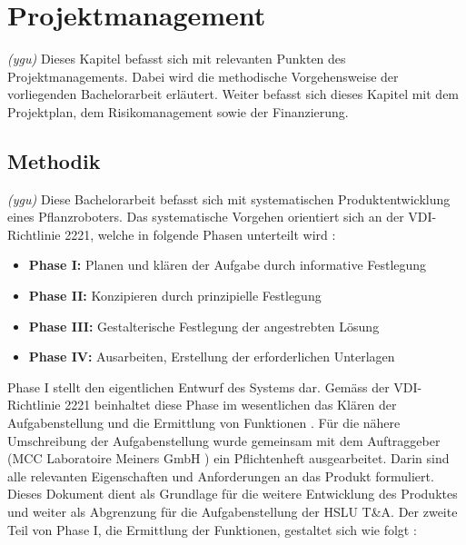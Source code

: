 \newpage
\section{Projektmanagement}
\textit{(ygu)} Dieses Kapitel befasst sich mit relevanten Punkten des Projektmanagements. Dabei wird die methodische Vorgehensweise der vorliegenden Bachelorarbeit erläutert. Weiter befasst sich dieses Kapitel mit dem Projektplan, dem Risikomanagement sowie der Finanzierung. 
\subsection{Methodik}
\label{methodik}
\textit{(ygu)} Diese Bachelorarbeit befasst sich mit systematischen Produktentwicklung eines Pflanzroboters. Das systematische Vorgehen orientiert sich  an der VDI-Richtlinie 2221, welche in folgende Phasen unterteilt wird \cite{naefe}:

\begin{itemize}
	\item \textbf{Phase I:} Planen und klären der Aufgabe durch informative Festlegung
	
	\item \textbf{Phase II:} Konzipieren durch prinzipielle Festlegung
	
	\item \textbf{Phase III:} Gestalterische Festlegung der angestrebten Lösung
	
	\item \textbf{Phase IV:} Ausarbeiten, Erstellung der erforderlichen Unterlagen
	
\end{itemize}

Phase I stellt den eigentlichen Entwurf des Systems dar. Gemäss der VDI-Richtlinie 2221 beinhaltet diese Phase im wesentlichen das Klären der Aufgabenstellung und die Ermittlung von Funktionen \cite{vdi2221}. Für die nähere Umschreibung der Aufgabenstellung wurde gemeinsam mit dem Auftraggeber (MCC Laboratoire Meiners GmbH ) ein Pflichtenheft ausgearbeitet. Darin sind alle relevanten Eigenschaften und Anforderungen an das Produkt formuliert. Dieses Dokument dient als Grundlage für die weitere Entwicklung des Produktes und weiter als Abgrenzung für die Aufgabenstellung der HSLU T\&A. Der zweite Teil von Phase I, die Ermittlung der Funktionen, gestaltet sich wie folgt \cite{pahl}:

